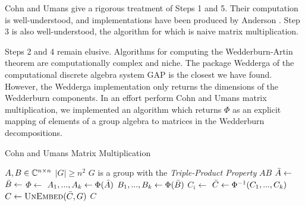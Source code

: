 \documentclass[../thesis.tex]{subfiles}
\begin{document}
Cohn and Umans give a rigorous treatment of Steps 1 and 5. Their computation is well-understood, and implementations have been produced by Anderson \cite{anderson}. Step 3 is also well-understood, the algorithm for which is naive matrix multiplication.

Steps 2 and 4 remain elusive. Algorithms for computing the Wedderburn-Artin theorem are computationally complex and niche. The package Wedderga \cite{wedderga} of the computational discrete algebra system GAP \cite{gap} is the closest we have found. However, the Wedderga implementation only returns the dimensions of the Wedderburn components. In an effort perform Cohn and Umans matrix multiplication, we implemented an algorithm which returns $\Phi$ as an explicit mapping of elements of a group algebra to matrices in the Wedderburn decompositions.

\begin{algorithm}[t]
\centering
\caption{Cohn and Umans Matrix Multiplication}\label{alg:CandUMatMult}
\begin{algorithmic}[1]
\Require $A,B\in\mathbb{C}^{n\times n}$
\Require $\left|G\right| \ge n^2$
\Require $G$ is a group with the \textit{Triple-Product Property}
    \State\Return $AB$
\EndIf
\State $\Bar{A}\gets$
\State $\Bar{B}\gets$
\State $\Phi\gets$
\State $A_1,...,A_k\gets\Phi(\Bar{A})$
\State $B_1,...,B_k\gets\Phi(\Bar{B})$
\State$C_i\gets$ 
\EndFor
\State $\Bar{C}\gets\Phi^{-1}(C_1,...,C_k)$
\State $C\gets\Call{UnEmbed}{\Bar{C},G}$
\State\Return $C$
\EndFunction
\end{algorithmic}
\end{algorithm}
\end{document}
